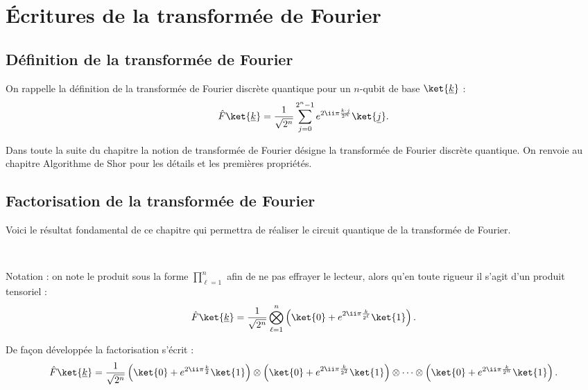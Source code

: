 \documentclass[11pt,class=report,crop=false]{standalone}
\begin{document}
\section{\'Ecritures de la transformée de Fourier}

\subsection{Définition de la transformée de Fourier}

On rappelle la définition de la transformée de Fourier discrète quantique pour un $n$-qubit de base $\ket{\underline k}$ :
\begin{equation}
\label{eq:deffourier}
\hat F \ket{\underline k} = \frac{1}{\sqrt{2^n}} \sum_{j=0}^{2^n-1} e^{2\ii \pi \frac{k \cdot j}{2^n}} \ket{\underline j}.
\end{equation}

Dans toute la suite du chapitre la notion de \og{}transformée de Fourier\fg{} désigne la transformée de Fourier discrète quantique.
On renvoie au chapitre \og{}Algorithme de Shor\fg{} pour les détails et les premières propriétés.

\subsection{Factorisation de la transformée de Fourier}

Voici le résultat fondamental de ce chapitre qui permettra de réaliser le circuit quantique de la transformée de Fourier.

\begin{theoreme}
\label{th:factor}
~
\end{theoreme}

Notation : on note le produit sous la forme $\prod_{\ell=1}^{n}$ afin de ne pas effrayer le lecteur, alors qu'en toute rigueur il s'agit d'un produit tensoriel : 
$$
\hat F \ket{\underline k} 
= \frac{1}{\sqrt{2^n}} \bigotimes_{\ell=1}^{n} 
\left( \ket{0} + e^{2\ii \pi \frac{k}{2^\ell}} \ket{1} \right)
.$$

De façon développée la factorisation s'écrit :
$$\hat F \ket{\underline k} 
= \frac{1}{\sqrt{2^n}} 
\left( \ket{0} + e^{2\ii \pi \frac{k}{2}} \ket{1} \right)
\otimes \left( \ket{0} + e^{2\ii \pi \frac{k}{2^2}} \ket{1} \right)
\otimes \cdots \otimes
\left( \ket{0} + e^{2\ii \pi \frac{k}{2^n}} \ket{1} \right).
$$
\end{document}

